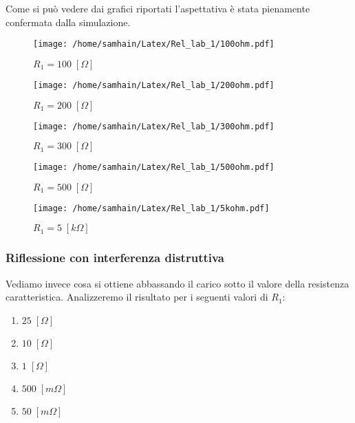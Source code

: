 \documentclass[]{report}
\begin{document}
Come si può vedere dai grafici riportati l'aspettativa è stata pienamente confermata dalla simulazione.

\begin{figure}[!htb]
	\centering
	\texttt{[image: /home/samhain/Latex/Rel\_lab\_1/100ohm.pdf]}
	\label{ergwxxg}
	\caption{\label{luegrevvvgegl} \small $R_1 = 100 \; [\Omega]$ }
\end{figure}

\begin{figure}[!htb]
	\centering
	\texttt{[image: /home/samhain/Latex/Rel\_lab\_1/200ohm.pdf]}
	\label{ergddwg}
	\caption{\label{luegrfffegegl} \small $R_1 = 200 \; [\Omega] $}
\end{figure}

\begin{figure}[!htb]
	\centering
	\texttt{[image: /home/samhain/Latex/Rel\_lab\_1/300ohm.pdf]}
	\label{ergw33xxg}
	\caption{\label{luegr33evvvgegl} \small $R_1 = 300 \; [\Omega]$ }
\end{figure}

\begin{figure}[!htb]
	\centering
	\texttt{[image: /home/samhain/Latex/Rel\_lab\_1/500ohm.pdf]}
	\label{e55rgddwg}
	\caption{\label{luegr55fffegegl} \small $R_1 = 500 \; [\Omega] $}
\end{figure}

\begin{figure}[!htb]
	\centering
	\texttt{[image: /home/samhain/Latex/Rel\_lab\_1/5kohm.pdf]}
	\label{e55cccrgddwg}
	\caption{\label{luegr5ccc5fffegegl} \small $R_1 = 5 \; [k\Omega] $}
\end{figure}






\clearpage

\subsubsection{Riflessione con interferenza distruttiva}

Vediamo invece cosa si ottiene abbassando il carico sotto il valore della resistenza caratteristica. Analizzeremo il risultato per i seguenti valori di $R_1$:
\begin{enumerate}
	\item $25 \; [\Omega]$	
	\item $10 \; [\Omega]$	
	\item $1 \; [\Omega]$
	\item $500 \; [m\Omega]$
	\item $50 \; [m\Omega]$
\end{enumerate}
\end{document}
